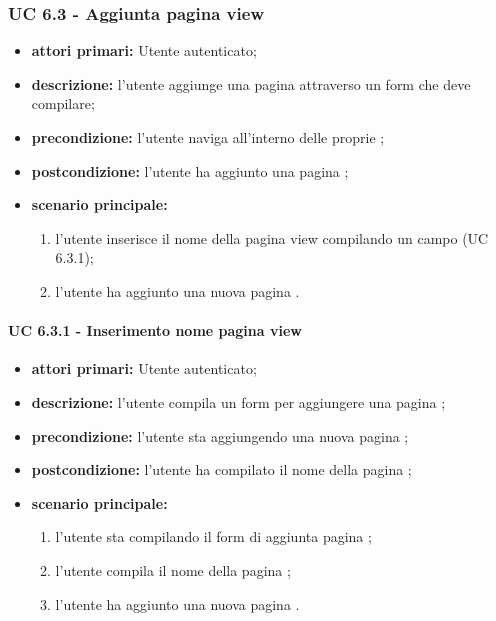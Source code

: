 			\subsubsection{UC 6.3 - Aggiunta pagina view}
			\begin{itemize}
				\item \textbf{attori primari:} Utente autenticato;
				\item \textbf{descrizione:} l'utente aggiunge una pagina  attraverso un form che deve compilare;
				\item \textbf{precondizione:} l'utente naviga all'interno delle proprie ;
				\item \textbf{postcondizione:} l'utente ha aggiunto una pagina ;
				\item \textbf{scenario principale:}
				\begin{enumerate}
					\item{l'utente inserisce il nome della pagina view compilando un campo (UC 6.3.1);}
					\item{l'utente ha aggiunto una nuova pagina .}
				\end{enumerate}	
			\end{itemize}

			\paragraph{UC 6.3.1 - Inserimento nome pagina view}
			\begin{itemize}
				\item \textbf{attori primari:} Utente autenticato;
				\item \textbf{descrizione:} l'utente compila un form per aggiungere una pagina ;
				\item \textbf{precondizione:} l'utente sta aggiungendo una nuova pagina ;
				\item \textbf{postcondizione:} l'utente ha compilato il nome della pagina ;
				\item \textbf{scenario principale:}
				\begin{enumerate}
					\item{l'utente sta compilando il form di aggiunta pagina ;}
					\item{l'utente compila il nome della pagina ;}
					\item{l'utente ha aggiunto una nuova pagina .}
				\end{enumerate}	
			\end{itemize}

